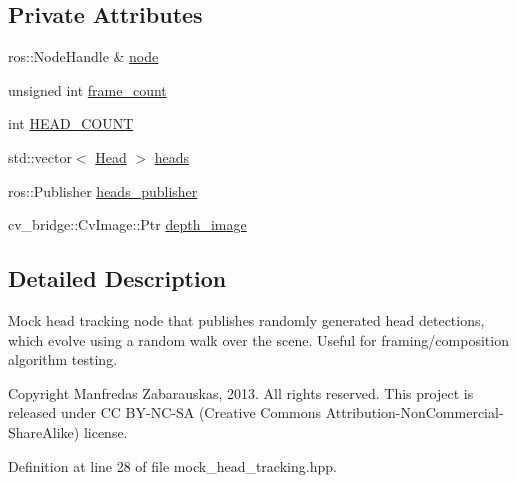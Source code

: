 \subsection*{\-Private \-Attributes}
\begin{DoxyCompactItemize}
\item 
ros\-::\-Node\-Handle \& \hyperlink{class_r_p_mock_head_tracking_node_a2294de9d2f407990783725f89aca9f43}{node}
\item 
unsigned int \hyperlink{class_r_p_mock_head_tracking_node_a00ba80d3ca138d7d586242a5655136f6}{frame\-\_\-count}
\item 
int \hyperlink{class_r_p_mock_head_tracking_node_a7397e364d5dec3ad0068e26dbb50e173}{\-H\-E\-A\-D\-\_\-\-C\-O\-U\-N\-T}
\item 
std\-::vector$<$ \hyperlink{struct_head}{\-Head} $>$ \hyperlink{class_r_p_mock_head_tracking_node_a9eb51fd17b3436f4d4058be0e1a204d8}{heads}
\item 
ros\-::\-Publisher \hyperlink{class_r_p_mock_head_tracking_node_a4d78d8388d295ef1120818d2e8f2954e}{heads\-\_\-publisher}
\item 
cv\-\_\-bridge\-::\-Cv\-Image\-::\-Ptr \hyperlink{class_r_p_mock_head_tracking_node_a94d8f99ef984c889f722bc6da057df5f}{depth\-\_\-image}
\end{DoxyCompactItemize}


\subsection{\-Detailed \-Description}
\-Mock head tracking node that publishes randomly generated head detections, which evolve using a random walk over the scene. \-Useful for framing/composition algorithm testing. 

\begin{DoxyCopyright}{\-Copyright}
\-Manfredas \-Zabarauskas, 2013. \-All rights reserved. \-This project is released under \-C\-C \-B\-Y-\/\-N\-C-\/\-S\-A (\-Creative \-Commons \-Attribution-\/\-Non\-Commercial-\/\-Share\-Alike) license. 
\end{DoxyCopyright}


\-Definition at line 28 of file mock\-\_\-head\-\_\-tracking.\-hpp.



